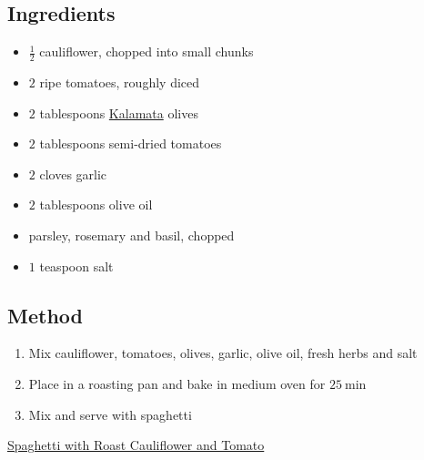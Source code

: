 \documentclass[11pt,a4paper]{article}
\begin{document}
\subsection*{Ingredients}

\begin{itemize}
  \item $ \frac{1}{2} $ cauliflower, chopped into small chunks
  \item $ 2 $ ripe tomatoes, roughly diced
  \item $ 2 $ tablespoons \href{https://en.wikipedia.org/wiki/Kalamata_olive }{Kalamata} olives
  \item $ 2 $ tablespoons semi-dried tomatoes
  \item $ 2 $ cloves garlic
  \item $ 2 $ tablespoons olive oil
  \item parsley, rosemary and basil, chopped
  \item $ 1 $ teaspoon salt
\end{itemize}

\medskip

\subsection*{Method}

\begin{enumerate}
  \item Mix cauliflower, tomatoes, olives, garlic, olive oil, fresh herbs and salt
  \item Place in a roasting pan and bake in medium oven for $ \qty{25}{\minute} $
  \item Mix and serve with spaghetti
\end{enumerate}

\href{https://www.wholesomebellies.com.au/recipes/spaghetti-with-roast-cauliflower-and-tomato/}{Spaghetti with Roast Cauliflower and Tomato}
\end{document}

